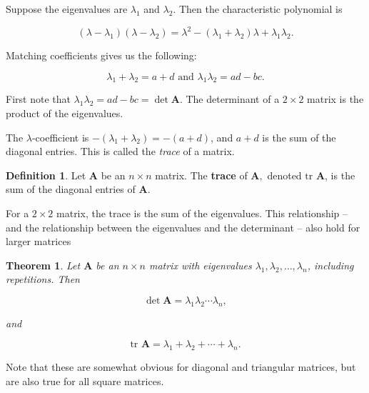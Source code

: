 \documentclass[
]{book}
\newtheorem{theorem}{Theorem}[chapter]
\theoremstyle{definition}
\newtheorem{definition}{Definition}[chapter]
\theoremstyle{definition}
\theoremstyle{definition}
\theoremstyle{definition}
\theoremstyle{remark}
\begin{document}
Suppose the eigenvalues are \(\lambda_1\) and \(\lambda_2\). Then the characteristic polynomial is

\[(\lambda-\lambda_1)(\lambda-\lambda_2)=\lambda^2-(\lambda_1+\lambda_2)\lambda+\lambda_1\lambda_2.\]

Matching coefficients gives us the following:

\[\lambda_1+\lambda_2=a+d\text{ and }\lambda_1\lambda_2=ad-bc.\]

First note that \(\lambda_1\lambda_2=ad-bc=\det \mathbf{A}\). The determinant of a \(2\times 2\) matrix is the product of the eigenvalues.

The \(\lambda\)-coefficient is \(-(\lambda_1+\lambda_2)=-(a+d)\), and \(a+d\) is the sum of the diagonal entries. This is called the \emph{trace} of a matrix.

\begin{defbox}

\begin{definition}
Let \(\mathbf{A}\) be an \(n\times n\) matrix. The \textbf{trace} of \(\mathbf{A},\) denoted \(\text{tr }\mathbf{A}\), is the sum of the diagonal entries of \(\mathbf{A}.\)
\end{definition}

\end{defbox}

For a \(2\times 2\) matrix, the trace is the sum of the eigenvalues. This relationship -- and the relationship between the eigenvalues and the determinant -- also hold for larger matrices

\begin{theorembox}

\begin{theorem}
Let \(\mathbf{A}\) be an \(n\times n\) matrix with eigenvalues \(\lambda_1,\lambda_2,\dots,\lambda_n\), including repetitions. Then

\[\det \mathbf{A}= \lambda_1\lambda_2\cdots \lambda_n,\]

and

\[\text{tr } \mathbf{A}= \lambda_1+\lambda_2+\cdots+\lambda_n.\]
\end{theorem}

\end{theorembox}

Note that these are somewhat obvious for diagonal and triangular matrices, but are also true for all square matrices.
\end{document}
